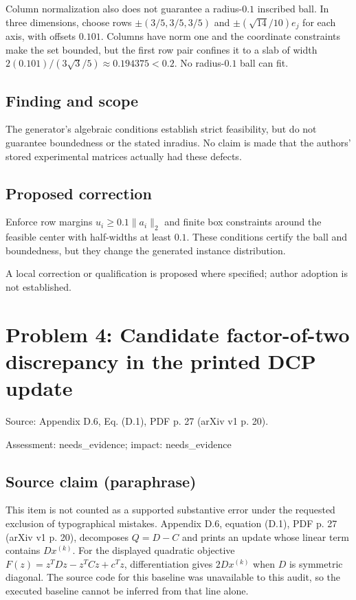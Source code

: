 \documentclass[11pt]{article}
\begin{document}
Column normalization also does not guarantee a radius-\(0.1\) inscribed ball. In three dimensions, choose rows \(\pm(3/5,3/5,3/5)\) and \(\pm(\sqrt{14}/10)e_j\) for each axis, with offsets \(0.101\). Columns have norm one and the coordinate constraints make the set bounded, but the first row pair confines it to a slab of width \(2(0.101)/(3\sqrt3/5)\approx0.194375<0.2\). No radius-\(0.1\) ball can fit.

\subsection*{Finding and scope}

The generator's algebraic conditions establish strict feasibility, but do not guarantee boundedness or the stated inradius. No claim is made that the authors' stored experimental matrices actually had these defects.

\subsection*{Proposed correction}

Enforce row margins \(u_i\ge0.1\|a_i\|_2\) and finite box constraints around the feasible center with half-widths at least \(0.1\). These conditions certify the ball and boundedness, but they change the generated instance distribution.

A local correction or qualification is proposed where specified; author adoption is not established.

\section*{Problem 4: Candidate factor-of-two discrepancy in the printed DCP update}

Source: Appendix D.6, Eq. (D.1), PDF p. 27 (arXiv v1 p. 20).

Assessment: needs\_evidence; impact: needs\_evidence

\subsection*{Source claim (paraphrase)}

This item is not counted as a supported substantive error under the requested exclusion of typographical mistakes. Appendix D.6, equation (D.1), PDF p. 27 (arXiv v1 p. 20), decomposes \(Q=D-C\) and prints an update whose linear term contains \(Dx^{(k)}\). For the displayed quadratic objective \(F(z)=z^TDz-z^TCz+c^Tz\), differentiation gives \(2Dx^{(k)}\) when \(D\) is symmetric diagonal. The source code for this baseline was unavailable to this audit, so the executed baseline cannot be inferred from that line alone.
\end{document}
